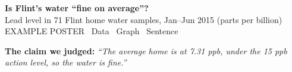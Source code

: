 \documentclass[12pt]{article}
\begin{document}
\pagestyle{empty}

\begin{center}
{\LARGE\bfseries Is Flint's water ``fine on average''?}\\[2pt]
{\large Lead level in 71 Flint home water samples, Jan--Jun 2015 (parts per billion)}\\[2pt]
{\small\color{framegray} EXAMPLE POSTER \textperiodcentered\ Data \textperiodcentered\ Graph \textperiodcentered\ Sentence}
\end{center}

\begin{tcolorbox}[enhanced,colback=warmredlt,colframe=warmred,boxrule=1pt,arc=2pt,left=8pt,right=8pt,top=4pt,bottom=4pt]
\textbf{The claim we judged:} \emph{``The average home is at 7.31 ppb, under the 15 ppb action level, so the water is fine.''}
\end{tcolorbox}
\end{document}
